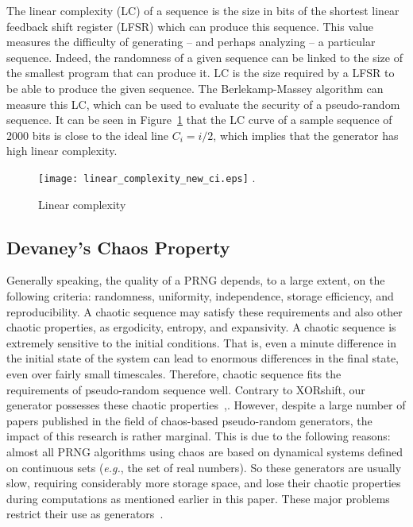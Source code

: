 \documentclass[journal]{IEEEtran}
\begin{document}
The linear complexity (LC) of a sequence is the size in bits of the shortest linear feedback shift register (LFSR) which can produce this sequence. This value measures the difficulty of generating -- and perhaps analyzing -- a particular sequence.
Indeed, the randomness of a given sequence can be linked to the size of the smallest program that can produce it. LC is the size required by a LFSR to be able to produce the given sequence. The Berlekamp-Massey algorithm can measure this LC, which can be used to evaluate the security of a pseudo-random sequence.
It can be seen in Figure~\ref{Linear complexity} that the LC curve of a sample sequence of 2000 bits is close to the ideal line $C_i=i/2$, which implies that the generator has high linear complexity.

\begin{figure}
\centering
\texttt{[image: linear\_complexity\_new\_ci.eps]}
\DeclareGraphicsExtensions.
\caption{Linear complexity}
\label{Linear complexity}
\end{figure}


\subsection{Devaney's Chaos Property}

Generally speaking, the quality of a PRNG depends, to a large extent, on the following criteria: randomness, uniformity, independence, storage efficiency, and reproducibility. A chaotic sequence may satisfy these requirements and also other chaotic properties, as ergodicity, entropy, and expansivity. A chaotic sequence is extremely sensitive to the initial conditions. That is, even a minute difference in the initial state of the system can lead to enormous differences in the final state, even over fairly small timescales. Therefore, chaotic sequence fits the requirements of pseudo-random sequence well. Contrary to XORshift, our generator possesses these chaotic properties~\cite{guyeux09},\cite{wang2009}.
However, despite a large number of papers published in the field of chaos-based pseudo-random generators, the impact of this research is rather marginal. This is due to the following reasons: almost all PRNG algorithms using chaos are based on dynamical systems defined on continuous sets (\emph{e.g.}, the set of real numbers). So these generators are usually slow, requiring considerably more storage space, and lose their chaotic properties during computations as mentioned earlier in this paper. These major problems restrict their use as generators~\cite{Kocarev2001}.
\end{document}
